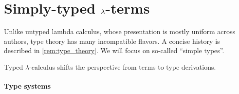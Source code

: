 \section{Simply-typed \texorpdfstring{\( {\mathrm \lambda} \)}{λ}-terms}\label{sec:simply_typed_lambda_terms}

Unlike untyped lambda calculus, whose presentation is mostly uniform across authors, type theory has many incompatible flavors. A concise history is described in \cref{rem:type_theory}. We will focus on so-called \enquote{simple types}.

Typed \( \lambda \)-calculus shifts the perspective from terms to type derivations.

\paragraph{Type systems}

